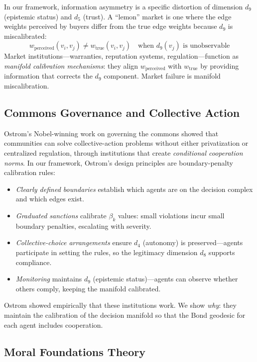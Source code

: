 \documentclass[12pt]{article}
\theoremstyle{definition}
\theoremstyle{remark}
\begin{document}
In our framework, information asymmetry is a specific distortion of dimension $d_9$ (epistemic status) and $d_5$ (trust).  A ``lemon'' market is one where the edge weights perceived by buyers differ from the true edge weights because $d_9$ is miscalibrated:
\begin{equation}
w_{\text{perceived}}(v_i, v_j) \neq w_{\text{true}}(v_i, v_j) \quad \text{when } d_9(v_j) \text{ is unobservable}
\end{equation}
Market institutions---warranties, reputation systems, regulation---function as \emph{manifold calibration mechanisms}: they align $w_{\text{perceived}}$ with $w_{\text{true}}$ by providing information that corrects the $d_9$ component.  Market failure is manifold miscalibration.

\subsection{Commons Governance and Collective Action}

Ostrom's \cite{ostrom1990} Nobel-winning work on governing the commons showed that communities can solve collective-action problems without either privatization or centralized regulation, through institutions that create \emph{conditional cooperation norms}.  In our framework, Ostrom's design principles are boundary-penalty calibration rules:

\begin{itemize}
    \item \emph{Clearly defined boundaries} establish which agents are on the decision complex and which edges exist.
    \item \emph{Graduated sanctions} calibrate $\beta_k$ values: small violations incur small boundary penalties, escalating with severity.
    \item \emph{Collective-choice arrangements} ensure $d_4$ (autonomy) is preserved---agents participate in setting the rules, so the legitimacy dimension $d_8$ supports compliance.
    \item \emph{Monitoring} maintains $d_9$ (epistemic status)---agents can observe whether others comply, keeping the manifold calibrated.
\end{itemize}

Ostrom showed empirically that these institutions work.  We show \emph{why}: they maintain the calibration of the decision manifold so that the Bond geodesic for each agent includes cooperation.

\subsection{Moral Foundations Theory}
\end{document}
